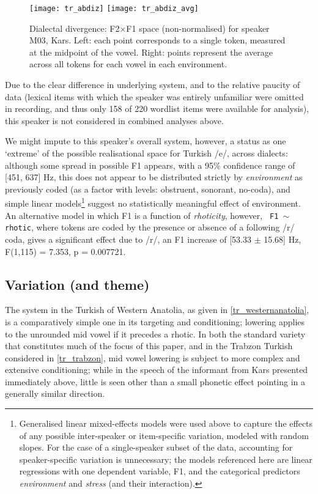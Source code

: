 \begin{figure}[ht]
  \centering
  \texttt{[image: tr\_abdiz]}
    \texttt{[image: tr\_abdiz\_avg]}
  \caption[Dialectal divergence: F2$\times$F1 space (non-normalised) for speaker M03, Kars.]{Dialectal divergence: F2$\times$F1 space (non-normalised) for speaker M03, Kars. Left: each point corresponds to a single token, measured at the midpoint of the vowel. Right: points represent the average across all tokens for each vowel in each environment.}
  \label{fig:abdiz}
\end{figure}

Due to the clear difference in underlying system, and to the relative paucity of data (lexical items with which the speaker was entirely unfamiliar were omitted in recording, and thus only 158 of 220 wordlist items were available for analysis), this speaker is not considered in combined analyses above.

We might impute to this speaker's overall system, however, a status as one `extreme' of the possible realisational space for Turkish /e/, across dialects: although some spread in possible F1 appears, with a 95\% confidence range of [451, 637] Hz, this does not appear to be distributed strictly by \emph{environment} as previously coded (as a factor with levels: obstruent, sonorant, no-coda), and simple linear models\footnote{Generalised linear mixed-effects models were used above to capture the effects of any possible inter-speaker or item-specific variation, modeled with random slopes. For the case of a single-speaker subset of the data, accounting for speaker-specific variation is unnecessary; the models referenced here are linear regressions with one dependent variable, F1, and the categorical predictors \emph{environment} and \emph{stress} (and their interaction).} suggest no statistically meaningful effect of environment. An alternative model in which F1 is a function of \emph{rhoticity}, however, \texttt{ F1 $\sim$ rhotic}, where tokens are coded by the presence or absence of a following /r/ coda, gives a significant effect due to /r/, an F1 increase of [53.33 $\pm$ 15.68] Hz, F(1,115) = 7.353, p = 0.007721.

\subsection{Variation (and theme)}\label{ss:trvariation}

The system in the Turkish of Western Anatolia, as given in \cref{tr_westernanatolia}, is a comparatively simple one in its targeting and conditioning; lowering applies to the unrounded mid vowel if it precedes a rhotic. In both the standard variety that constitutes much of the focus of this paper, and in the Trabzon Turkish considered in \cref{tr_trabzon}, mid vowel lowering is subject to more complex and extensive conditioning; while in the speech of the informant from Kars presented immediately above, little is seen other than a small phonetic effect pointing in a generally similar direction.


